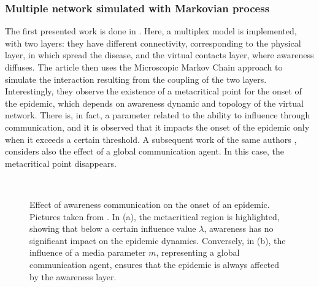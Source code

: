 \subsubsection{Multiple network simulated with Markovian process}
The first presented work is done in \cite{Granell_2014}. Here, a multiplex model is implemented, with two layers: they have different connectivity, corresponding to the physical layer, in which spread the disease, and the virtual contacts layer, where awareness diffuses. The article then uses the Microscopic Markov Chain approach to simulate the interaction resulting from the coupling of the two layers. Interestingly, they observe the existence of a metacritical point for the onset of the epidemic, which depends on awareness dynamic and topology of the virtual network. There is, in fact, a parameter related to the ability to influence through communication, and it is observed that it impacts the onset of the epidemic only when it exceeds a certain threshold.
A subsequent work of the same authors \cite{Granell2013}, considers also the effect of a global communication agent. In this case, the metacritical point disappears. 
\begin{figure}[h]
	\centering
	 \quad
	 \\
	\caption[Metacritical effect]{Effect of awareness communication on the onset of an epidemic. Pictures taken from \cite{Granell2013, Granell_2014}. In (a), the metacritical region is highlighted, showing that below a certain influence value $\lambda$, awareness has no significant impact on the epidemic dynamics. Conversely, in (b), the influence of a media parameter $m$, representing a global communication agent, ensures that the epidemic is always affected by the awareness layer.}
	\label{fig:sir_example2}
\end{figure}


